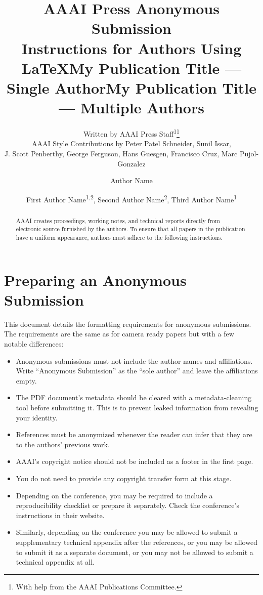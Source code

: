 \documentclass[letterpaper]{article} %
\title{AAAI Press Anonymous Submission\\Instructions for Authors Using \LaTeX{}}
\author{
    Written by AAAI Press Staff\textsuperscript{\rm 1}\thanks{With help from the AAAI Publications Committee.}\\
    AAAI Style Contributions by Peter Patel Schneider,
    Sunil Issar,\\
    J. Scott Penberthy,
    George Ferguson,
    Hans Guesgen,
    Francisco Cruz\equalcontrib\corresponding,
    Marc Pujol-Gonzalez\equalcontrib\corresponding
}
\title{My Publication Title --- Single Author}
\author {
    Author Name
}
\title{My Publication Title --- Multiple Authors}
\author {
    First Author Name\textsuperscript{\rm 1,\rm 2}\equalcontrib,
    Second Author Name\textsuperscript{\rm 2}\equalcontrib,
    Third Author Name\textsuperscript{\rm 1}\corresponding
}
\begin{document}
\maketitle

\begin{abstract}
AAAI creates proceedings, working notes, and technical reports directly from electronic source furnished by the authors. To ensure that all papers in the publication have a uniform appearance, authors must adhere to the following instructions.
\end{abstract}


\section{Preparing an Anonymous Submission}

This document details the formatting requirements for anonymous submissions. The requirements are the same as for camera ready papers but with a few notable differences:

\begin{itemize}
    \item Anonymous submissions must not include the author names and affiliations. Write ``Anonymous Submission'' as the ``sole author'' and leave the affiliations empty.
    \item The PDF document's metadata should be cleared with a metadata-cleaning tool before submitting it. This is to prevent leaked information from revealing your identity.
    \item References must be anonymized whenever the reader can infer that they are to the authors' previous work.
    \item AAAI's copyright notice should not be included as a footer in the first page.
    \item You do not need to provide any copyright transfer form at this stage.
    \item Depending on the conference, you may be required to include a reproducibility checklist or prepare it separately. Check the conference's instructions in their website.
    \item Similarly, depending on the conference you may be allowed to submit a supplementary technical appendix after the references, or you may be allowed to submit it as a separate document, or you may not be allowed to submit a technical appendix at all.
\end{itemize}
\end{document}
